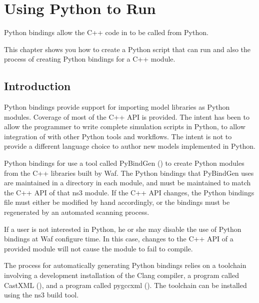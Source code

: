 \documentclass[letterpaper,10pt,english]{sphinxmanual}
\renewcommand{\sphinxcode}[1]{\texttt{\small{#1}}}
\begin{document}
\chapter{Using Python to Run }
\label{\detokenize{python:using-python-to-run-ns3}}\label{\detokenize{python::doc}}
Python bindings allow the C++ code in  to be called from Python.

This chapter shows you how to create a Python script that can run  and also the process of creating Python bindings for a C++  module.


\section{Introduction}
\label{\detokenize{python:introduction}}
Python bindings provide support for importing  model libraries as Python
modules.  Coverage of most of the  C++ API is provided.  The intent
has been to allow the programmer to write complete simulation scripts in
Python, to allow integration of  with other Python tools and workflows.
The intent is not to provide a different language choice to author new
 models implemented in Python.

Python bindings for  use a tool called PyBindGen () to create Python modules from the C++ libraries built by
Waf.  The Python bindings that PyBindGen uses are maintained in a
\sphinxcode{} directory in each module, and must be maintained to match the
C++ API of that ns\sphinxhyphen{}3 module.  If the C++ API changes, the Python bindings file
must either be modified by hand accordingly, or the bindings must be
regenerated by an automated scanning process.

If a user is not interested in Python, he or she may disable the use of
Python bindings at Waf configure time.  In this case, changes to the C++
API of a provided module will not cause the module to fail to compile.

The process for automatically generating Python bindings relies on a toolchain
involving a development installation of the Clang compiler, a program called
CastXML (), and a program called
pygccxml ().  The toolchain can be installed
using the ns\sphinxhyphen{}3 \sphinxcode{} build tool.
\end{document}
